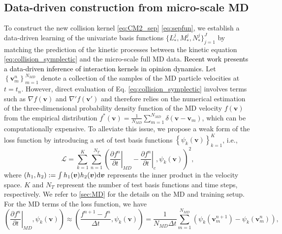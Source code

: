 \documentclass[preprint,1p,times]{elsarticle}
\theoremstyle{definition}
\theoremstyle{remark}
\newcommand{\tcr}[1]{\textcolor{black}{#1}}
\begin{document}



\subsection{Data-driven construction from micro-scale MD}
\label{subsec:NNConstruct}

To construct the new collision kernel \eqref{eq:CM2_sep} \eqref{eq:sepfun}, we establish a data-driven learning of the univariate basis functions $\{L_{\ast}^{j}, M_{\ast}^{j}, N_{\ast}^{j}\}_{j=1}^{J}$ by matching the prediction of the kinetic processes between the kinetic equation \eqref{eq:collision_symplectic} and the micro-scale full MD data.
\tcr{Recent work \cite{chu2024inference} presents a data-driven inference of interaction kernels in opinion dynamics.}
Let $\left \{\boldsymbol{v}_{m}^{n}\right\}_{m=1}^{N_{MD}}$ denote a collection of the samples of the MD particle velocities at $t=t_n$. However, direct evaluation of Eq. \eqref{eq:collision_symplectic} involves terms such as $\nabla f(\boldsymbol{v})$ and $\nabla' f(\boldsymbol{v}')$ and therefore
relies on the numerical estimation of the three-dimensional probability density function of the MD velocity $f(\boldsymbol{v})$ from the empirical distribution $f^{\ast}(\boldsymbol{v}) = \frac{1}{N_{MD}}\sum_{m=1}^{N_{MD}} \delta(\boldsymbol{v}-\boldsymbol{v}_{m})$, which can be computationally expensive.
To alleviate this issue, we propose a weak form of the loss function by introducing a set of test basis functions $\left \{\psi_k(\boldsymbol{v})\right\}_{k=1}^K$, i.e.,
\begin{equation}\label{eq:loss}
    \mathcal{L}= \sum_{k=1}^K \sum_{n=1}^{N_T} \left(\left.\dfrac{\partial f^n}{\partial t}\right|_{MD}-\left.\dfrac{\partial f^n}{\partial t}\right|_{c},\psi_k(\boldsymbol{v})\right)^2,
\end{equation}
where $(h_1, h_2) := \int h_1(\boldsymbol{v}) h_2(\boldsymbol{v}) {\rm d} \boldsymbol{v}$ represents the inner product in the velocity space.  $K$ and $N_T$ represent the number of test basis functions and time steps, respectively. We refer to \ref{sec:MD} for the details on the MD and training setup. For the MD terms of the loss function, we have
\begin{equation}
    \left(\left.\dfrac{\partial f^n}{\partial t}\right|_{MD}, \psi_k(\boldsymbol{v})\right) \approx\left(\dfrac{f^{n+1}-f^{n}}{\Delta t},\psi_k(\boldsymbol{v})\right)
    =\dfrac{1}{N_{MD}\Delta t}\sum_{m=1}^{N_{MD}} (\psi_k(\boldsymbol{v}_{m}^{n+1})-\psi_k(\boldsymbol{v}_{m}^{n})),
\end{equation}
\end{document}
